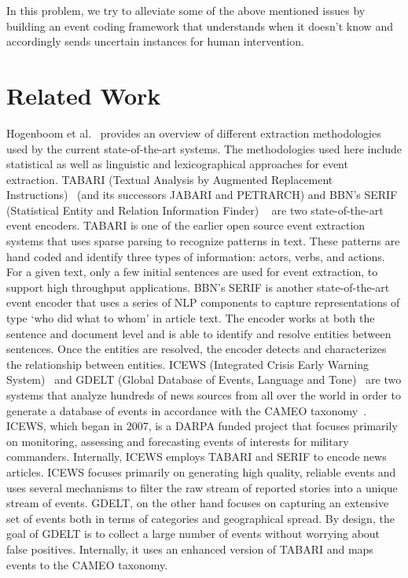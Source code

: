 In this problem, we try to alleviate some of the above mentioned issues by building an event coding framework that understands when it doesn't know and accordingly sends uncertain instances for human intervention.


\section{Related Work}
 Hogenboom et al.~\cite{hogenboom2011overview} provides  an  overview  of  different extraction methodologies used by the current state-of-the-art systems. The methodologies used here include statistical as well as linguistic and lexicographical approaches for event extraction. TABARI (Textual Analysis by Augmented Replacement Instructions)~\cite{schrodt2009tabari} (and its successors JABARI and PETRARCH) and BBN’s SERIF (Statistical Entity and Relation Information Finder) ~\cite{bishop2007discrete,ramshaw2011serif} are two state-of-the-art event encoders. TABARI is one of the earlier open source event extraction systems that uses sparse parsing to recognize patterns in text.  These patterns are hand coded and identify three types of information:  actors, verbs, and actions.  For a given text, only a few initial sentences are used for event extraction, to support high throughput applications. BBN’s SERIF is another state-of-the-art event encoder that uses a series of NLP components to capture representations of type ‘who did what to whom’ in article text. The encoder works at both the sentence and document level and is able to identify and resolve entities between sentences.  Once the entities are resolved, the encoder detects and characterizes the relationship between entities. ICEWS (Integrated Crisis Early Warning System)~\cite{boschee2015icews} and GDELT (Global Database of Events, Language and Tone)~\cite{leetaru2013gdelt} are two systems that analyze hundreds of news sources from all over the world in order to generate a database of events in accordance with the CAMEO taxonomy~\cite{schrodt2012cameo}. ICEWS, which began in 2007, is a DARPA funded project that focuses primarily on monitoring, assessing and forecasting events of interests for military commanders. Internally, ICEWS employs TABARI and SERIF to encode news articles.  ICEWS focuses primarily on generating high quality, reliable events and uses several mechanisms to filter the raw stream of reported stories into a unique stream of events. GDELT, on the other hand focuses on capturing an extensive set of events both in terms of categories and geographical spread.  By design, the goal of GDELT is to collect a large number of events without worrying about false positives. Internally, it uses an enhanced version of TABARI and maps events to the CAMEO taxonomy.



